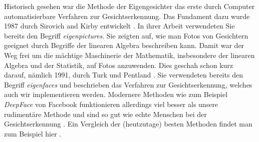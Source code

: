 Historisch gesehen war die Methode der Eigengesichter das erste durch Computer automatisierbare Verfahren zur Gesichtserkennung.
Das Fundament dazu wurde 1987 durch Sirovich and Kirby entwickelt \cite{SirovichKirby1987}.
In ihrer Arbeit verwendeten Sie bereits den Begriff \textit{eigenpictures}.
Sie zeigten auf, wie man Fotos von Gesichtern geeignet durch Begriffe der linearen Algebra beschreiben kann.
Damit war der Weg frei um die mächtige Maschinerie der Mathematik, insbesondere der linearen Algebra und der Statistik, auf Fotos anzuwenden.
Dies geschah schon kurz darauf, nämlich 1991, durch Turk und Pentland \cite{Turk1991}.
Sie verwendeten bereits den Begriff \textit{eigenfaces} und beschrieben das Verfahren zur Gesichtserkennung, welches auch wir implementieren werden.
Modernere Methoden wie zum Beispiel \textit{DeepFace} von Facebook funktionieren allerdings viel besser als unsere rudimentäre Methode und sind so gut wie echte Menschen bei der Gesichtserkennung \cite{Taigman2014}.
Ein Vergleich der (heutzutage) besten Methoden findet man zum Beispiel hier \cite{Taskiran2020}.

